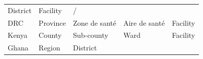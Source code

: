 \documentclass[]{book}
\begin{document}
\begin{longtable}[]{@{}lllll@{}}
\begin{minipage}[t]{0.20\columnwidth}
District\strut
\end{minipage} & \begin{minipage}[t]{0.20\columnwidth}\raggedright
Facility\strut
\end{minipage} & \begin{minipage}[t]{0.20\columnwidth}\raggedright
/\strut
\end{minipage}\tabularnewline
\begin{minipage}[t]{0.07\columnwidth}\raggedright
DRC\strut
\end{minipage} & \begin{minipage}[t]{0.20\columnwidth}\raggedright
Province\strut
\end{minipage} & \begin{minipage}[t]{0.20\columnwidth}\raggedright
Zone de santé\strut
\end{minipage} & \begin{minipage}[t]{0.20\columnwidth}\raggedright
Aire de santé\strut
\end{minipage} & \begin{minipage}[t]{0.20\columnwidth}\raggedright
Facility\strut
\end{minipage}\tabularnewline
\begin{minipage}[t]{0.07\columnwidth}\raggedright
Kenya\strut
\end{minipage} & \begin{minipage}[t]{0.20\columnwidth}\raggedright
County\strut
\end{minipage} & \begin{minipage}[t]{0.20\columnwidth}\raggedright
Sub-county\strut
\end{minipage} & \begin{minipage}[t]{0.20\columnwidth}\raggedright
Ward\strut
\end{minipage} & \begin{minipage}[t]{0.20\columnwidth}\raggedright
Facility\strut
\end{minipage}\tabularnewline
\begin{minipage}[t]{0.07\columnwidth}\raggedright
Ghana\strut
\end{minipage} & \begin{minipage}[t]{0.20\columnwidth}\raggedright
Region\strut
\end{minipage} & \begin{minipage}[t]{0.20\columnwidth}\raggedright
District\strut
\end{minipage} & \begin{minipage}[t]{0.20\columnwidth}\raggedright

\end{minipage}
\end{longtable}
\end{document}
